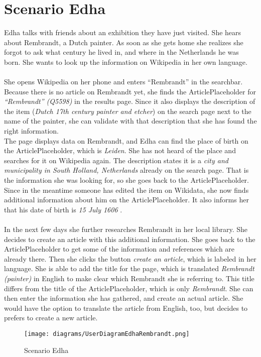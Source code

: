 \section{Scenario Edha} 
Edha talks with friends about an exhibition they have just visited. She hears about Rembrandt, a Dutch painter. As soon as she gets home she realizes she forgot to ask what century he lived in, and where in the Netherlands he was born. She wants to look up the information on Wikipedia in her own language. \\
\\ 
She opens Wikipedia on her phone and enters ``Rembrandt'' in the searchbar. Because there is no article on Rembrandt yet, she finds the ArticlePlaceholder for \textit{``Rembrandt'' (Q5598)} \citep{wd:01} in the results page. Since it also displays the description of the item (\textit{Dutch 17th century painter and etcher}) on the search page next to the name of the painter, she can validate with that description that she has found the right information. \\
The page displays data on Rembrandt, and Edha can find the place of birth on the ArticlePlaceholder, which is \textit{Leiden}. She has not heard of the place and searches for it on Wikipedia again. The description states it is a \textit{city and municipality in South Holland, Netherlands} \citep{wd:02} already on the search page. That is the information she was looking for, so she goes back to the ArticlePlaceholder. Since in the meantime someone has edited the item on Wikidata, she now finds additional information about him on the ArticlePlaceholder. It also informs her that his date of birth is \textit{15 July 1606} \citep{wd:01}. \\
\\
In the next few days she further researches Rembrandt in her local library. She decides to create an article with this additional information. She goes back to the ArticlePlaceholder to get some of the information and references which are already there. Then she clicks the button \textit{create an article}, which is labeled in her language. She is able to add the title for the page, which is translated \textit{Rembrandt (painter)} in English to make clear which Rembrandt she is referring to. This title differs from the title of the ArticlePlaceholder, which is only \textit{Rembrandt}. She can then enter the information she has gathered, and create an actual article. She would have the option to translate the article from English, too, but decides to prefers to create a new article.
\begin{figure}[H]
	\centering
	\texttt{[image: diagrams/UserDiagramEdhaRembrandt.png]}
	\caption{Scenario Edha}
	\label{fig:ScenarioEdha}
\end{figure}

